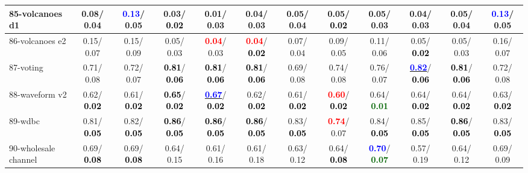 \begin{table}[h]
\begin{center}
{\begin{tabular}{lc|c|c|c|c|c|c|c|c|c|c}
85-volcanoes d1 &   0.08/  0.04 & \textcolor{blue}{\textbf{  0.13}}/  0.05 &   0.03/\textcolor{black}{\textbf{  0.02}} &   0.01/  0.03 &   0.04/  0.03 &   0.05/  0.04 &   0.05/\textcolor{black}{\textbf{  0.02}} &   0.05/  0.03 &   0.04/  0.03 &   0.05/  0.04 & \textcolor{blue}{\textbf{  0.13}}/  0.05 \\ \hline
86-volcanoes e2 &   0.15/  0.07 &   0.15/  0.09 &   0.05/  0.03 & \textcolor{red}{\textbf{  0.04}}/  0.03 & \textcolor{red}{\textbf{  0.04}}/\textcolor{black}{\textbf{  0.02}} &   0.07/  0.04 &   0.09/  0.05 &   0.11/  0.06 &   0.05/\textcolor{black}{\textbf{  0.02}} &   0.05/  0.03 &   0.16/  0.07 \\
87-voting &   0.71/  0.08 &   0.72/  0.07 & \textcolor{black}{\textbf{  0.81}}/\textcolor{black}{\textbf{  0.06}} & \textcolor{black}{\textbf{  0.81}}/\textcolor{black}{\textbf{  0.06}} & \textcolor{black}{\textbf{  0.81}}/\textcolor{black}{\textbf{  0.06}} &   0.69/  0.08 &   0.74/  0.08 &   0.76/  0.07 & \underline{\textcolor{blue}{\textbf{  0.82}}}/\textcolor{black}{\textbf{  0.06}} & \textcolor{black}{\textbf{  0.81}}/\textcolor{black}{\textbf{  0.06}} &   0.72/  0.08 \\
88-waveform v2 &   0.62/\textcolor{black}{\textbf{  0.02}} &   0.61/\textcolor{black}{\textbf{  0.02}} & \textcolor{black}{\textbf{  0.65}}/\textcolor{black}{\textbf{  0.02}} & \underline{\textcolor{blue}{\textbf{  0.67}}}/\textcolor{black}{\textbf{  0.02}} &   0.62/\textcolor{black}{\textbf{  0.02}} &   0.61/\textcolor{black}{\textbf{  0.02}} & \textcolor{red}{\textbf{  0.60}}/\textcolor{black}{\textbf{  0.02}} &   0.64/\textcolor{darkgreen}{\textbf{  0.01}} &   0.64/\textcolor{black}{\textbf{  0.02}} &   0.64/\textcolor{black}{\textbf{  0.02}} &   0.63/\textcolor{black}{\textbf{  0.02}} \\
89-wdbc &   0.81/\textcolor{black}{\textbf{  0.05}} &   0.82/\textcolor{black}{\textbf{  0.05}} & \textcolor{black}{\textbf{  0.86}}/\textcolor{black}{\textbf{  0.05}} & \textcolor{black}{\textbf{  0.86}}/\textcolor{black}{\textbf{  0.05}} & \textcolor{black}{\textbf{  0.86}}/\textcolor{black}{\textbf{  0.05}} &   0.83/\textcolor{black}{\textbf{  0.05}} & \textcolor{red}{\textbf{  0.74}}/  0.07 &   0.84/\textcolor{black}{\textbf{  0.05}} &   0.85/\textcolor{black}{\textbf{  0.05}} & \textcolor{black}{\textbf{  0.86}}/\textcolor{black}{\textbf{  0.05}} &   0.83/\textcolor{black}{\textbf{  0.05}} \\
90-wholesale channel &   0.69/\textcolor{black}{\textbf{  0.08}} &   0.69/\textcolor{black}{\textbf{  0.08}} &   0.64/  0.15 &   0.61/  0.16 &   0.61/  0.18 &   0.63/  0.12 &   0.64/\textcolor{black}{\textbf{  0.08}} & \textcolor{blue}{\textbf{  0.70}}/\textcolor{darkgreen}{\textbf{  0.07}} &   0.57/  0.19 &   0.64/  0.12 &   0.69/  0.09 \\

\end{tabular}}
\end{center}
\end{table}
